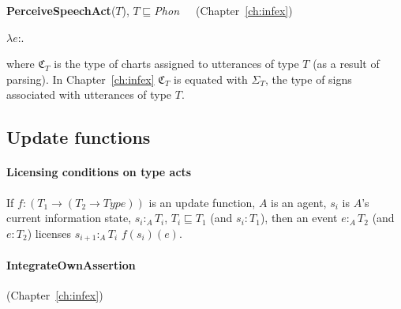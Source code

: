 \textbf{PerceiveSpeechAct}($T$), $T$$\sqsubseteq$\textit{Phon}\ \ \ (Chapter~\ref{ch:infex})

$\lambda e$:. \\
\hspace*{2em}

where $\mathfrak{C}_T$ is the type of charts assigned to utterances of
type $T$ (as a result of parsing).  In Chapter~\ref{ch:infex}
$\mathfrak{C}_T$ is equated with $\Sigma_T$, the type of signs
associated with utterances of type $T$.

\subsection{Update functions}
\label{app:updatefuns}

\paragraph{Licensing conditions on type acts}

If $f:(T_1\rightarrow(T_2\rightarrow\textit{Type}))$ is an update
function, $A$ is an agent, $s_i$ is $A$'s current information state,
$s_i:_A T_i$, $T_i\sqsubseteq T_1$ (and $s_i:T_1$), then an event $e:_A
T_2$ (and $e:T_2$) licenses $s_{i+1}:_A T_i$ \fbox{\d{$\wedge$}}
$f(s_i)(e)$.


\paragraph{IntegrateOwnAssertion} (Chapter~\ref{ch:infex})


